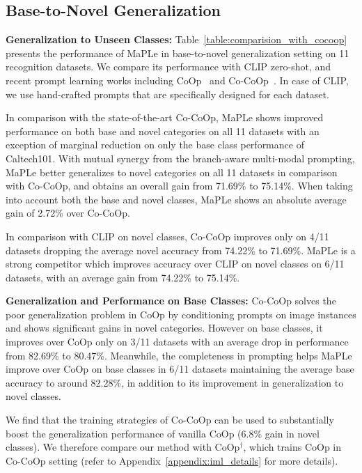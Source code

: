 \documentclass[10pt,twocolumn,letterpaper]{article}
\begin{document}
\subsection{Base-to-Novel Generalization}
\label{lab:comparision_base_to_new}
\noindent \textbf{Generalization to Unseen Classes:} Table~\ref{table:comparision_with_cocoop} presents the performance of MaPLe in base-to-novel generalization setting on 11 recognition datasets. We compare its performance with CLIP zero-shot, and recent prompt learning works including CoOp~\cite{zhou2022learning} and Co-CoOp~\cite{zhou2022conditional}. In case of CLIP, we use hand-crafted prompts that are specifically designed for each dataset.

In comparison with the state-of-the-art Co-CoOp, MaPLe shows improved performance on both base and novel categories on all 11 datasets with an exception of marginal reduction on only the base class performance of Caltech101. With mutual synergy from the branch-aware multi-modal prompting, MaPLe better generalizes to novel categories on all 11 datasets in comparison with Co-CoOp, and obtains an overall gain from 71.69\% to 75.14\%. When taking into account both the base and novel classes, MaPLe shows an absolute average gain of 2.72\% over Co-CoOp. 

In comparison with CLIP on novel classes, Co-CoOp improves only on 4/11 datasets dropping the average novel accuracy from 74.22\% to 71.69\%. MaPLe is a strong competitor which improves accuracy over CLIP on novel classes on 6/11 datasets, with an average gain from 74.22\% to 75.14\%.

\noindent \textbf{Generalization and Performance on Base Classes:} 
Co-CoOp solves the poor generalization problem in CoOp by conditioning prompts on image instances and shows significant gains in novel categories. However on base classes, it improves over CoOp only on 3/11 datasets with an average drop in performance from 82.69\% to 80.47\%. Meanwhile, the completeness in prompting helps MaPLe improve over CoOp on base classes in 6/11 datasets maintaining the average base accuracy to around 82.28\%, in addition to its improvement in generalization to novel classes.

We find that the training strategies of Co-CoOp can be used to substantially boost the generalization performance of vanilla CoOp (6.8\% gain in novel classes). We therefore compare our method with CoOp$^{\dag}$, which trains CoOp in Co-CoOp setting (refer to Appendix~\ref{appendix:iml_details} for more details).
\end{document}
